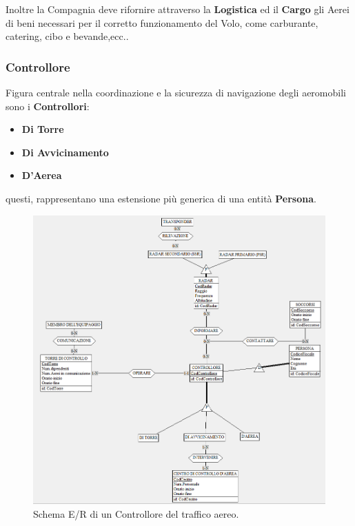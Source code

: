 \textsf{\small Inoltre la Compagnia deve rifornire attraverso la \textbf{Logistica} ed il \textbf{Cargo} gli Aerei di beni necessari per il corretto funzionamento del Volo, come carburante, catering, cibo e bevande,ecc..}\\


\newpage

\enlargethispage{1\linewidth}

\subsubsection{Controllore}

\textsf{\small Figura centrale nella coordinazione e la sicurezza di navigazione degli aeromobili sono i \textbf{Controllori}: }\\
\begin{itemize}
	\item \textbf{\small Di Torre}
	\item \textbf{\small Di Avvicinamento}
	\item \textbf{\small D'Aerea}
\end{itemize}

\textsf{\small questi, rappresentano una estensione più generica di una entità \textbf{Persona}.}\\

\begin{figure}[H] 
	\centering
	\includegraphics[width=1.2\linewidth, height=1.2\textheight, keepaspectratio]{./img/Schema_Concettuale/Controllore.png}
	\caption{Schema E/R di un Controllore del traffico aereo.}
	\label{fig:schema_controllore}
\end{figure}

